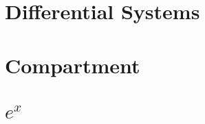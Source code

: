 \documentclass[Orator]{subfiles}
\begin{document}
\section{Differential Systems}

\section{Compartment}

\section{\(e^{x}\)}
\end{document}
